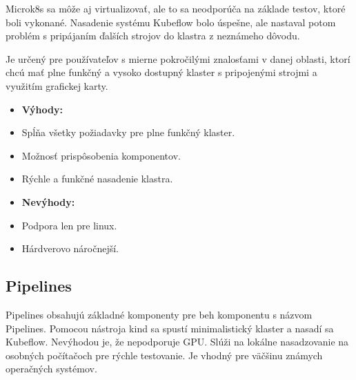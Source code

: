 Microk8s sa môže aj virtualizovať, ale to sa neodporúča na základe testov, ktoré boli vykonané. Nasadenie systému Kubeflow bolo úspešne, ale nastaval potom problém s pripájaním ďalších strojov do klastra z neznámeho dôvodu.

Je určený pre používateľov s mierne pokročilými znalosťami v danej oblasti, ktorí chcú mať plne funkčný a vysoko dostupný klaster s pripojenými strojmi a využitím grafickej karty.
\newline
\newline
\begin{minipage}[t]{.55\textwidth}
    \begin{itemize}
        \item []\textbf{Výhody:}
        \item Spĺňa všetky požiadavky pre plne funkčný klaster.
	    \item Možnosť prispôsobenia komponentov.
        \item Rýchle a funkčné nasadenie klastra.
    \end{itemize}
\end{minipage}%
\begin{minipage}[t]{.45\textwidth}
    \begin{itemize}
        \item []\textbf{Nevýhody:}
        \item Podpora len pre linux.
	\item Hárdverovo náročnejší.
    \end{itemize}
\end{minipage}

\subsection*{Pipelines}

Pipelines obsahujú základné komponenty pre beh komponentu s názvom Pipelines. Pomocou nástroja kind sa spustí minimalistický klaster a nasadí sa Kubeflow. Nevýhodou je, že nepodporuje GPU. Slúži na lokálne nasadzovanie na osobných počítačoch pre rýchle testovanie. Je vhodný pre väčšinu známych operačných systémov.

